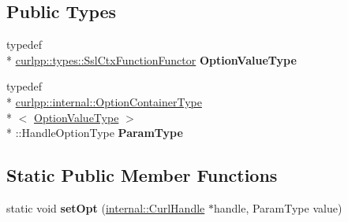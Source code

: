 \subsection*{Public Types}
\begin{DoxyCompactItemize}
\item 
\hypertarget{classcurlpp_1_1internal_1_1OptionSetter_3_01curlpp_1_1types_1_1SslCtxFunctionFunctor_00_01CURLOPT__SSL__CTX__FUNCTION_01_4_a40c16bf8af54abf2826779ba245be6df}{typedef \\*
\hyperlink{classutilspp_1_1Functor}{curlpp\-::types\-::\-Ssl\-Ctx\-Function\-Functor} {\bfseries Option\-Value\-Type}}\label{classcurlpp_1_1internal_1_1OptionSetter_3_01curlpp_1_1types_1_1SslCtxFunctionFunctor_00_01CURLOPT__SSL__CTX__FUNCTION_01_4_a40c16bf8af54abf2826779ba245be6df}

\item 
\hypertarget{classcurlpp_1_1internal_1_1OptionSetter_3_01curlpp_1_1types_1_1SslCtxFunctionFunctor_00_01CURLOPT__SSL__CTX__FUNCTION_01_4_aaf88b3dbad5d8e11807da245635b77b0}{typedef \\*
\hyperlink{structcurlpp_1_1internal_1_1OptionContainerType}{curlpp\-::internal\-::\-Option\-Container\-Type}\\*
$<$ \hyperlink{classutilspp_1_1Functor}{Option\-Value\-Type} $>$\\*
\-::Handle\-Option\-Type {\bfseries Param\-Type}}\label{classcurlpp_1_1internal_1_1OptionSetter_3_01curlpp_1_1types_1_1SslCtxFunctionFunctor_00_01CURLOPT__SSL__CTX__FUNCTION_01_4_aaf88b3dbad5d8e11807da245635b77b0}

\end{DoxyCompactItemize}
\subsection*{Static Public Member Functions}
\begin{DoxyCompactItemize}
\item 
\hypertarget{classcurlpp_1_1internal_1_1OptionSetter_3_01curlpp_1_1types_1_1SslCtxFunctionFunctor_00_01CURLOPT__SSL__CTX__FUNCTION_01_4_a363ae4e5ab9389ac33aaab34c4e177d9}{static void {\bfseries set\-Opt} (\hyperlink{classcurlpp_1_1internal_1_1CurlHandle}{internal\-::\-Curl\-Handle} $\ast$handle, Param\-Type value)}\label{classcurlpp_1_1internal_1_1OptionSetter_3_01curlpp_1_1types_1_1SslCtxFunctionFunctor_00_01CURLOPT__SSL__CTX__FUNCTION_01_4_a363ae4e5ab9389ac33aaab34c4e177d9}

\end{DoxyCompactItemize}


